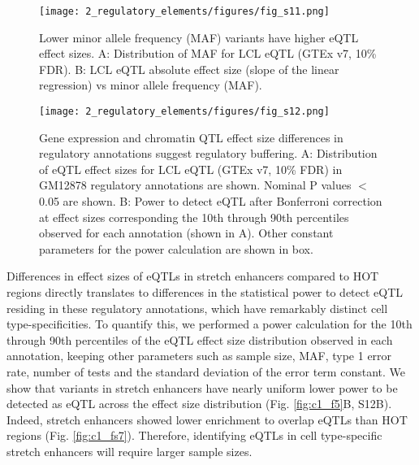 \begin{figure}
    \centering
    \texttt{[image: 2\_regulatory\_elements/figures/fig\_s11.png]}
    \caption{Lower minor allele frequency (MAF) variants have higher eQTL effect sizes. A: Distribution of MAF for LCL eQTL (GTEx v7, 10\% FDR). B: LCL eQTL absolute effect size (slope of the linear regression) vs minor allele frequency (MAF).}
    \label{fig:c1_fs11}
\end{figure}

\begin{figure}
    \centering
    \texttt{[image: 2\_regulatory\_elements/figures/fig\_s12.png]}
    \caption{Gene expression and chromatin QTL effect size differences in regulatory annotations suggest regulatory buffering. A: Distribution of eQTL effect sizes for LCL eQTL (GTEx v7, 10\% FDR) in GM12878 regulatory annotations are shown. Nominal P values $<$ 0.05 are shown. B: Power to detect eQTL after Bonferroni correction at effect sizes corresponding the 10th through 90th percentiles observed for each annotation (shown in A). Other constant parameters for the power calculation are shown in box.
}
    \label{fig:c1_fs12}
\end{figure}

Differences in effect sizes of eQTLs in stretch enhancers compared to HOT regions directly translates to differences in the statistical power to detect eQTL residing in these regulatory annotations, which have remarkably distinct cell type-specificities. To quantify this, we performed a power calculation for the 10th through 90th percentiles of the eQTL effect size distribution observed in each annotation, keeping other parameters such as sample size, MAF, type 1 error rate, number of tests and the standard deviation of the error term constant. We show that variants in stretch enhancers have nearly uniform lower power to be detected as eQTL across the effect size distribution (Fig. \ref{fig:c1_f5}B, S12B). Indeed, stretch enhancers showed lower enrichment to overlap eQTLs than HOT regions (Fig. \ref{fig:c1_fs7}). Therefore, identifying eQTLs in cell type-specific stretch enhancers will require larger sample sizes. \\

